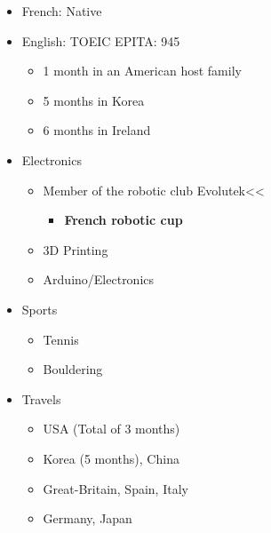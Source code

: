\documentclass[a4paper,table]{twentysecondcv} %
\begin{document}
{  \begin{itemize}[leftmargin=1mm]
    \setlength\itemsep{-5pt}
    \item French: Native
    \item English: TOEIC EPITA: 945
      \vspace{-5pt}
    \begin{itemize}
      \setlength\itemsep{-5pt}
      \item 1 month in an American host family
      \item 5 months in Korea
      \item 6 months in Ireland
    \end{itemize}
  \end{itemize}
  \begin{flushleft}
  \begin{itemize}[leftmargin=1mm]
    \setlength\itemsep{-5pt}
    \item Electronics
    \vspace{-5pt}
    \begin{itemize}
      \setlength\itemsep{-5pt}
      \item Member of the robotic club Evolutek<<
      \vspace{-5pt}
      \begin{itemize}
        \setlength\itemsep{-5pt}
        \item \textbf{French robotic cup}
      \end{itemize}
      \item 3D Printing
      \item Arduino/Electronics
    \end{itemize}
    \item Sports
    \vspace{-5pt}
    \begin{itemize}
      \setlength\itemsep{-5pt}
      \item Tennis
      \item Bouldering
    \end{itemize}
    \item Travels
    \vspace{-5pt}
    \begin{itemize}
      \setlength\itemsep{-5pt}
      \item USA (Total of 3 months)
      \item Korea (5 months), China
      \item Great-Britain, Spain, Italy
      \item Germany, Japan
    \end{itemize}
  \end{itemize}
  \end{flushleft}
}
\end{document}
